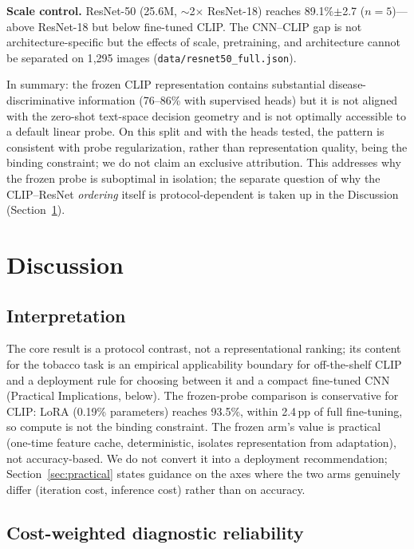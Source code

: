 \documentclass[10pt,a4paper]{article}
\begin{document}
\textbf{Scale control.} ResNet-50 (25.6M, $\sim$2$\times$ ResNet-18) reaches 89.1\%$\pm$2.7 ($n{=}5$)---above ResNet-18 but below fine-tuned CLIP. The CNN--CLIP gap is not architecture-specific but the effects of scale, pretraining, and architecture cannot be separated on 1{,}295 images (\texttt{data/resnet50\_full.json}).

In summary: the frozen CLIP representation contains substantial disease-discriminative information (76--86\% with supervised heads) but it is not aligned with the zero-shot text-space decision geometry and is not optimally accessible to a default linear probe. On this split and with the heads tested, the pattern is consistent with probe regularization, rather than representation quality, being the binding constraint; we do not claim an exclusive attribution. This addresses why the frozen probe is suboptimal in isolation; the separate question of why the CLIP--ResNet \emph{ordering} itself is protocol-dependent is taken up in the Discussion (Section~\ref{sec:discussion}).

\section{Discussion}
\label{sec:discussion}

\subsection{Interpretation}

The core result is a protocol contrast, not a representational ranking; its content for the tobacco task is an empirical applicability boundary for off-the-shelf CLIP and a deployment rule for choosing between it and a compact fine-tuned CNN (Practical Implications, below). The frozen-probe comparison is conservative for CLIP: LoRA (0.19\% parameters) reaches 93.5\%, within 2.4\,pp of full fine-tuning, so compute is not the binding constraint. The frozen arm's value is practical (one-time feature cache, deterministic, isolates representation from adaptation), not accuracy-based. We do not convert it into a deployment recommendation; Section~\ref{sec:practical} states guidance on the axes where the two arms genuinely differ (iteration cost, inference cost) rather than on accuracy.

\subsection{Cost-weighted diagnostic reliability}
\end{document}
